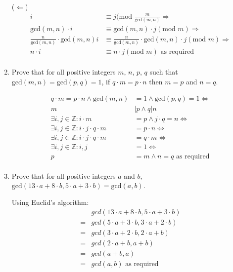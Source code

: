 \documentclass[10pt,\jkfside,a4paper]{article}
\begin{document}
\begin{enumerate}
($\Longleftarrow$)
\begin{equation}
\begin{split}
i &\equiv j (\text{mod } \frac{m}{\text{gcd}(m, n)}\Longrightarrow\\
\text{gcd}(m, n)\cdot i &\equiv \text{gcd}(m, n)\cdot j (\text{mod } m)\Longrightarrow\\
\frac{n}{\text{gcd}(m, n)}\cdot \text{gcd}(m, n) i &\equiv \frac{n}{\text{gcd}(m, n)} \cdot \text{gcd}(m, n) \cdot j (\text{mod } m)\Longrightarrow\\
n\cdot i &\equiv n\cdot j (\text{mod } m)\text{ as required}\\
\end{split}
\end{equation}


\item Prove that for all positive integers $m$, $n$, $p$, $q$ such that $\text{gcd}(m,n) = \text{gcd}(p,q) = 1$, if $q\cdot m = p\cdot n$ 
then $m = p$ and $n = q$.

\begin{equation}
\begin{split}
q\cdot m = p\cdot n \wedge \text{gcd}(m, n) &= 1 \wedge \text{gcd}(p, q) = 1\Longleftrightarrow\\
m &| p \wedge q | n\\
\exists i, j \in \mathbb{Z}: i \cdot m &= p \wedge j \cdot q = n\Longleftrightarrow\\
\exists i, j \in \mathbb{Z}: i \cdot j \cdot q \cdot m &= p\cdot n\Longleftrightarrow\\
\exists i, j \in \mathbb{Z}: i \cdot j \cdot q \cdot m &= q\cdot m\Longleftrightarrow\\
\exists i, j \in \mathbb{Z}: i, j &= 1\Longleftrightarrow\\
p &= m \wedge n = q \text{ as required}\\
\end{split}
\end{equation}

\item Prove that for all positive integers $a$ and $b$, $\text{gcd}(13\cdot a + 8\cdot b, 5\cdot a + 3\cdot b)=\text{gcd}(a,b)$.

Using Euclid's algorithm:
\begin{equation}
\begin{split}
 & gcd(13\cdot a + 8\cdot b, 5\cdot a + 3\cdot b)\\
=& gcd(5\cdot a + 3\cdot b, 3\cdot a + 2\cdot b)\\
=& gcd(3\cdot a + 2\cdot b, 2\cdot a + b)\\
=& gcd(2\cdot a + b, a + b)\\
=& gcd(a + b, a)\\
=& gcd(a, b)\text{ as required}\\
\end{split}
\end{equation}


\end{enumerate}
\end{document}
